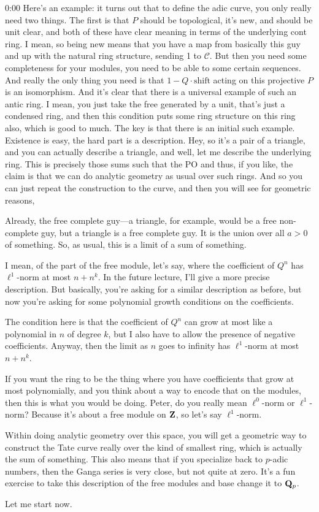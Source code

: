 \begin{unfinished}{0:00}
Here's an example: it turns out that to define the adic curve, you only really need two things. The first is that $P$ should be topological, it's new, and should be unit clear, and both of these have clear meaning in terms of the underlying cont ring. I mean, so being new means that you have a map from basically this guy and up with the natural ring structure, sending 1 to $\mathcal{C}$. But then you need some completeness for your modules, you need to be able to some certain sequences. And really the only thing you need is that $1 - Q \cdot \text{shift}$ acting on this projective $P$ is an isomorphism. And it's clear that there is a universal example of such an antic ring. I mean, you just take the free generated by a unit, that's just a condensed ring, and then this condition puts some ring structure on this ring also, which is good to much. The key is that there is an initial such example. Existence is easy, the hard part is a description. Hey, so it's a pair of a triangle, and you can actually describe a triangle, and well, let me describe the underlying ring. This is precisely those sums such that the PO and thus, if you like, the claim is that we can do analytic geometry as usual over such rings. And so you can just repeat the construction to the curve, and then you will see for geometric reasons,

Already, the free complete guy---a triangle, for example, would be a free non-complete guy, but a triangle is a free complete guy. It is the union over all $a > 0$ of something. So, as usual, this is a limit of a sum of something. 

I mean, of the part of the free module, let's say, where the coefficient of $Q^n$ has $\ell^1$-norm at most $n + n^k$. In the future lecture, I'll give a more precise description. But basically, you're asking for a similar description as before, but now you're asking for some polynomial growth conditions on the coefficients.

The condition here is that the coefficient of $Q^n$ can grow at most like a polynomial in $n$ of degree $k$, but I also have to allow the presence of negative coefficients. Anyway, then the limit as $n$ goes to infinity has $\ell^1$-norm at most $n + n^k$.

If you want the ring to be the thing where you have coefficients that grow at most polynomially, and you think about a way to encode that on the modules, then this is what you would be doing. Peter, do you really mean $\ell^0$-norm or $\ell^1$-norm? Because it's about a free module on $\mathbf Z$, so let's say $\ell^1$-norm.

Within doing analytic geometry over this space, you will get a geometric way to construct the Tate curve really over the kind of smallest ring, which is actually the sum of something. This also means that if you specialize back to $p$-adic numbers, then the Ganga series is very close, but not quite at zero. It's a fun exercise to take this description of the free modules and base change it to $\mathbf Q_p$.

Let me start now.

\end{unfinished}
